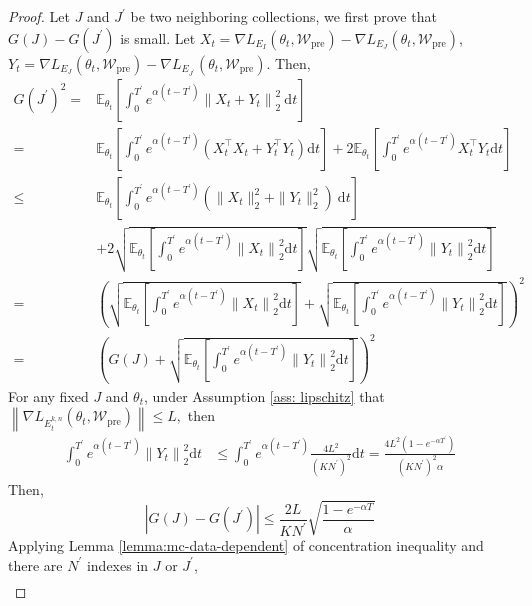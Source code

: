 \begin{proof}
	Let $J$ and $J^{\prime}$ be two neighboring collections, we first prove that $G(J)-G(J^{\prime})$ is small. Let $X_t=\nabla L_{E_I}(\theta_t, \mathcal{W}_{\text{pre}})-\nabla L_{E_J}(\theta_t, \mathcal{W}_{\text{pre}})$, $Y_t=\nabla L_{E_J}(\theta_t, \mathcal{W}_{\text{pre}})-\nabla L_{E_{J^\prime}}(\theta_t, \mathcal{W}_{\text{pre}})$. Then,
	$$
	\begin{aligned}
		G(J^{\prime})^{2} =&\mathbb{E}_{\theta_t}\left[\int_0^{T^\prime}e^{\alpha(t-{T^\prime})}\left\|X_t+Y_t\right\|_2^2\mathrm{~d}t\right]  \\
		=&\mathbb{E}_{\theta_t}\left[\int_0^{T^\prime}e^{\alpha(t-{T^\prime})}\left(X_t^\top X_t+Y_t^\top Y_t\right)\mathrm{d}t\right]+2\mathbb{E}_{\theta_t}\left[\int_0^{T^\prime}e^{\alpha(t-{T^\prime})}X_t^\top Y_t\mathrm{d}t\right] \\
		\leq&\mathbb{E}_{\theta_t}\left[\int_0^{T^\prime}e^{\alpha(t-{T^\prime})}\left(\|X_t\|_2^2+\|Y_t\|_2^2\right)\mathrm{~d}t\right]\\
		&+2\sqrt{\mathbb{E}_{\theta_t}\left[\int_{0}^{{T^\prime}}e^{\alpha(t-{T^\prime})}\left\|X_{t}\right\|_{2}^{2}\mathrm{d}t\right]}\sqrt{\mathbb{E}_{\theta_t}\left[\int_{0}^{{T^\prime}}e^{\alpha(t-{T^\prime})}\left\|Y_{t}\right\|_{2}^{2}\mathrm{d}t\right]} \\
		=&\left(\sqrt{\mathbb{E}_{\theta_t}\left[\int_0^{T^\prime}e^{\alpha(t-{T^\prime})}\left\|X_t\right\|_2^2\mathrm{d}t\right]}+\sqrt{\mathbb{E}_{\theta_t}\left[\int_0^{T^\prime}e^{\alpha(t-{T^\prime})}\left\|Y_t\right\|_2^2\mathrm{d}t\right]}\right)^2 \\
		=&\left(G(J)+\sqrt{\mathbb{E}_{\theta_t}\left[\int_0^{T^\prime}e^{\alpha(t-{T^\prime})}\left\|Y_t\right\|_2^2\mathrm{d}t\right]}\right)^2
	\end{aligned}
	$$
	For any fixed $J$ and $\theta_t$, under Assumption \ref{ass: lipschitz} that $\left\|\nabla L_{E^{k,n}_t}(\theta_t, \mathcal{W}_{\text{pre}})\right\| \leq L,$ then
	$$
	\begin{aligned}
		\int_0^{T^\prime}e^{\alpha(t-{T^\prime})}\left\|Y_t\right\|_2^2\mathrm{d}t& \leq\int_0^{T^\prime}e^{\alpha(t-{T^\prime})}\frac{4L^2}{{(KN^\prime)}^2}\mathrm{d}t=\frac{4L^2(1-e^{-\alpha {T^\prime}})}{{(KN^\prime)}^2\alpha}
	\end{aligned}
	$$
	Then,
	$$
	\left|G(J)-G(J^{\prime})\right| \leq  \frac{2L}{KN^\prime} \sqrt{\frac{1-e^{-\alpha T}}{\alpha}}
	$$
	Applying Lemma \ref{lemma:mc-data-dependent} of concentration inequality and there are $N^\prime$ indexes in $J$ or $J^\prime$,
	$$
	\begin{aligned}

\end{aligned}$$
\end{proof}
